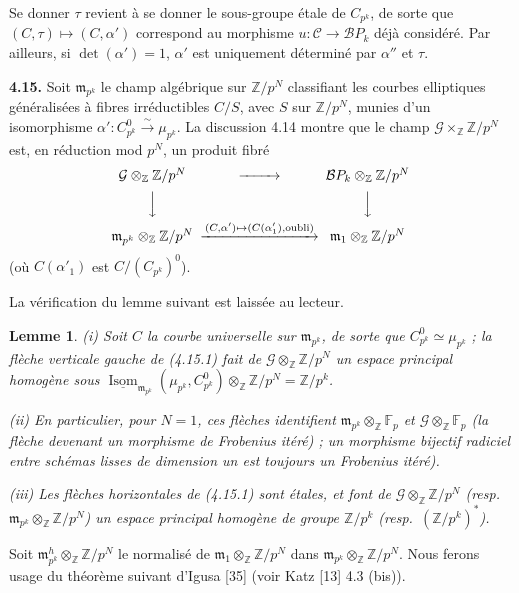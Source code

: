 \documentclass[10pt,a4paper]{amsart}
\theoremstyle{plain}
\newtheorem{lemma}[theorem]{Lemme}
\theoremstyle{definition}
\DeclareMathOperator{\Isom}{Isom}
\newcommand{\m}{\mathfrak{m}}
\newcommand{\cC}{\mathcal{C}}
\newcommand{\cG}{\mathcal{G}}
\newcommand{\FF}{\mathbb{F}}
\newcommand{\ZZ}{\mathbb{Z}}
\newcommand{\cB}{\mathcal{B}}
\begin{document}
Se donner $\tau$ revient \`a se donner le sous-groupe \'etale de $C_{p^k}$, de sorte que $(C, \tau) \mapsto (C, \alpha')$ correspond au morphisme $u : \cC \to \cB P_k$ d\'ej\`a consid\'er\'e. Par ailleurs, si $\det(\alpha') = 1$, $\alpha'$ est uniquement d\'etermin\'e par $\alpha''$ et $\tau$.

\medskip\noindent\textbf{4.15.} Soit $\m_{p^k}$ le champ alg\'ebrique sur $\ZZ/p^N$ classifiant les courbes elliptiques g\'en\'eralis\'ees \`a fibres irr\'eductibles $C/S$, avec $S$ sur $\ZZ/p^N$, munies d'un isomorphisme $\alpha' : C_{p^k}^0 \xrightarrow{\sim} \mu_{p^k}$. La discussion 4.14 montre que le champ $\cG \times_\ZZ \ZZ/p^N$ est, en r\'eduction mod $p^N$, un produit fibr\'e
\begin{equation}
\begin{CD}
\cG \otimes_\ZZ \ZZ/p^N @>>> \cB P_k \otimes_\ZZ \ZZ/p^N \\
@VVV @VVV \\
\m_{p^k} \otimes_\ZZ \ZZ/p^N @>{(C,\alpha') \mapsto (C(\alpha'_1),\text{oubli})}>> \m_1 \otimes_\ZZ \ZZ/p^N
\end{CD}
\end{equation}
(o\`u $C(\alpha'_1)$ est $C/(C_{p^k})^0$).

La v\'erification du lemme suivant est laiss\'ee au lecteur.

\setcounter{theorem}{15}
\begin{lemma}
\emph{(i)} Soit $C$ la courbe universelle sur $\m_{p^k}$, de sorte que $C_{p^k}^0 \simeq \mu_{p^k}$ ; la fl\`eche verticale gauche de (4.15.1) fait de $\cG \otimes_\ZZ \ZZ/p^N$ un espace principal homog\`ene sous $\underline{\Isom}_{\m_{p^k}}(\mu_{p^k}, C_{p^k}^0) \otimes_\ZZ \ZZ/p^N = \ZZ/p^k$.

\emph{(ii)} En particulier, pour $N = 1$, ces fl\`eches identifient $\m_{p^k} \otimes_\ZZ \FF_p$ et $\cG \otimes_\ZZ \FF_p$ (la fl\`eche devenant un morphisme de Frobenius it\'er\'e) ; un morphisme bijectif radiciel entre sch\'emas lisses de dimension un est toujours un Frobenius it\'er\'e).

\emph{(iii)} Les fl\`eches horizontales de (4.15.1) sont \'etales, et font de $\cG \otimes_\ZZ \ZZ/p^N$ (resp.\ $\m_{p^k} \otimes_\ZZ \ZZ/p^N$) un espace principal homog\`ene de groupe $\ZZ/p^k$ (resp.\ $(\ZZ/p^k)^*$).
\end{lemma}

Soit $\m_{p^k}^h \otimes_\ZZ \ZZ/p^N$ le normalis\'e de $\m_1 \otimes_\ZZ \ZZ/p^N$ dans $\m_{p^k} \otimes_\ZZ \ZZ/p^N$.
Nous ferons usage du th\'eor\`eme suivant d'Igusa [35] (voir Katz [13] 4.3 (bis)).
\end{document}
